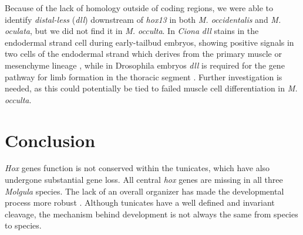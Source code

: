 Because of the lack of homology outside of coding regions, we were able to identify \textit{distal-less} (\textit{dll}) downstream of \textit{hox13} in both \textit{M. occidentalis} and \textit{M. oculata}, but we did not find it in \textit{M. occulta}. In \textit{Ciona} \textit{dll} stains in the endodermal strand cell during early-tailbud embryos, showing positive signals in two cells of the endodermal strand \cite{caracciolo_identification_2000} which derives from the primary muscle or mesenchyme lineage \cite{rossomando_morphogenesis:_1992}, while in Drosophila embryos \textit{dll} is required for the gene pathway for limb formation in the thoracic segment \cite{vachon_homeotic_1992}. Further investigation is needed, as this could potentially be tied to failed muscle cell differentiation in \textit{M. occulta}.

\section{Conclusion}
\textit{Hox} genes function is not conserved within the tunicates, which have also undergone substantial gene loss. All central \textit{hox} genes are missing in all three \textit{Molgula} species. The lack of an overall organizer has made the developmental process more robust \cite{lemaire_unfolding_2009}. Although tunicates have a well defined and invariant cleavage, the mechanism behind development is not always the same from species to species.
